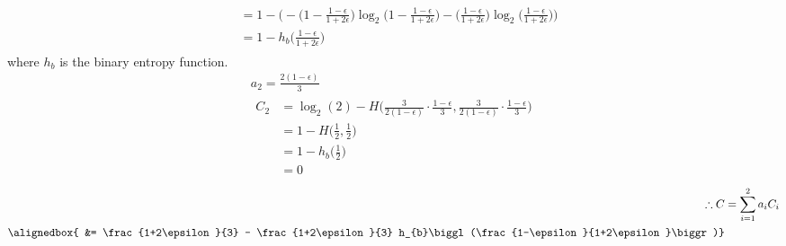 \documentclass[
  coursecode={MTHE 474},
  assignmentname={Homework \homeworknumber},
  studentnumber=20053722,
  name={Bryan Hoang},
  draft,
]{
  ltxanswer%
}
\begin{document}
\begin{questions}
\begin{parts}
\begin{solution}
\begin{gather*}
\begin{aligned}
                  &= 1 - \Biggl(-\biggl(1-\frac{1-\epsilon}{1+2\epsilon}\biggr) \log_{2} \biggl(1-\frac{1-\epsilon}{1+2\epsilon}\biggr) - \biggl(\frac{1-\epsilon}{1+2\epsilon} \biggr)\log_{2} \biggl(\frac{1-\epsilon}{1+2\epsilon}\biggr)\Biggr) \\
                  &= 1 - h_{b}\biggl(\frac{1-\epsilon}{1+2\epsilon}\biggr)
          \end{aligned}
        \end{gather*}
        where \(h_{b}\) is the binary entropy function.
        \begin{gather*}
          a_{2} = \frac{2(1-\epsilon)}{3} \\
          \begin{aligned}
            C_{2} &= \log_{2}(2) - H\biggl(\frac{3}{2(1-\epsilon)}\cdot\frac{1-\epsilon}{3},\frac{3}{2(1-\epsilon)}\cdot\frac{1-\epsilon}{3}\biggr) \\
                  &= 1 - H\biggl(\frac{1}{2},\frac{1}{2}\biggr)                                                                                     \\
                  &= 1 - h_{b}\biggl(\frac{1}{2}\biggr)                                                                                             \\
                  &= 0
          \end{aligned}
        \end{gather*}
        \begin{align*}
          \therefore C &= \sum_{i=1}^{2} a_{i} C_{i}                                                                       \\
          \alignedbox{ &= \frac{1+2\epsilon}{3} - \frac{1+2\epsilon}{3} h_{b}\biggl(\frac{1-\epsilon}{1+2\epsilon}\biggr)}
        \end{align*}
      \end{solution}
    \end{parts}
  \end{questions}
\end{document}
